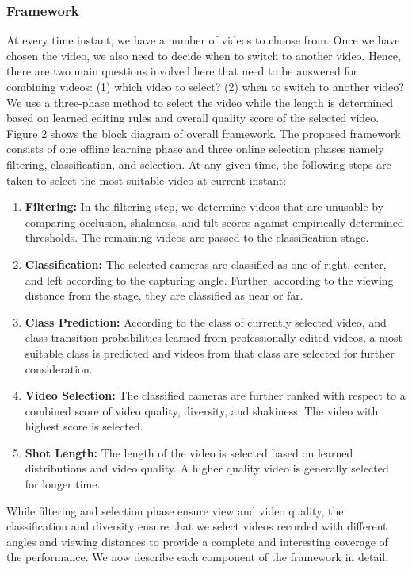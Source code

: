 \documentclass{sig-alternate}
\begin{document}
{{{\subsubsection{Framework}
At every time instant, we have a number of videos to choose
from. Once we have chosen the video, we also need to decide when
to switch to another video. Hence, there are two main questions
involved here that need to be answered for combining videos: (1)
which video to select? (2) when to switch to another video? We
use a three-phase method to select the video while the length is
determined based on learned editing rules and overall quality score
of the selected video.\\
Figure 2 shows the block diagram of overall framework. The
proposed framework consists of one offline learning phase and three 
online selection phases namely filtering, classification, and selection.
At any given time, the following steps are taken to select the
most suitable video at current instant:

\begin{enumerate}
    \item \textbf{Filtering: }In the filtering step, we determine videos that are
unusable by comparing occlusion, shakiness, and tilt scores
against empirically determined thresholds. The remaining
videos are passed to the classification stage.
   \item \textbf{Classification: }The selected cameras are classified as one
of right, center, and left according to the capturing angle.
Further, according to the viewing distance from the stage,
they are classified as near or far.
   \item \textbf{Class Prediction: }According to the class of currently selected
video, and class transition probabilities learned from
professionally edited videos, a most suitable class is predicted
and videos from that class are selected for further consideration.
   \item \textbf{Video Selection: }The classified cameras are further ranked
with respect to a combined score of video quality, diversity,
and shakiness. The video with highest score is selected.
   \item \textbf{Shot Length: }The length of the video is selected based on
learned distributions and video quality. A higher quality video
is generally selected for longer time.
\end{enumerate}
While filtering and selection phase ensure view and video quality,
the classification and diversity ensure that we select videos
recorded with different angles and viewing distances to provide a
complete and interesting coverage of the performance. We now
describe each component of the framework in detail.

}}}
\end{document}
